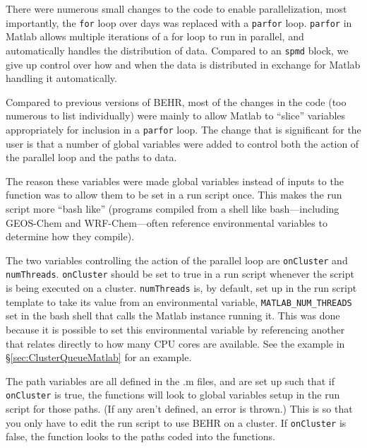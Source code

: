 \documentclass[12pt]{article}
\begin{document}
		There were numerous small changes to the code to enable parallelization, most importantly, the \texttt{for} loop over days was replaced with a \texttt{parfor} loop. \texttt{parfor} in Matlab allows multiple iterations of a for loop to run in parallel, and automatically handles the distribution of data.  Compared to an \texttt{spmd} block, we give up control over how and when the data is distributed in exchange for Matlab handling it automatically.
		
		Compared to previous versions of BEHR, most of the changes in the code (too numerous to list individually) were mainly to allow Matlab to ``slice'' variables appropriately for inclusion in a \texttt{parfor} loop.  The change that is significant for the user is that a number of global variables were added to control both the action of the parallel loop and the paths to data.  

		The reason these variables were made global variables instead of inputs to the function was to allow them to be set in a run script once. This makes the run script more ``bash like'' (programs compiled from a shell like bash---including GEOS-Chem and WRF-Chem---often reference environmental variables to determine how they compile).  
		
		The two variables controlling the action of the parallel loop are \texttt{onCluster} and \texttt{numThreads}. \texttt{onCluster} should be set to true in a run script whenever the script is being executed on a cluster.  \texttt{numThreads} is, by default, set up in the run script template to take its value from an environmental variable, \texttt{MATLAB\_NUM\_THREADS} set in the bash shell that calls the Matlab instance running it.  This was done because it is possible to set this environmental variable by referencing another that relates directly to how many CPU cores are available.  See the example in \S\ref{sec:ClusterQueueMatlab} for an example.
		
		The path variables are all defined in the .m files, and are set up such that if \texttt{onCluster} is true, the functions will look to global variables setup in the run script for those paths. (If any aren't defined, an error is thrown.)  This is so that you only have to edit the run script to use BEHR on a cluster.  If \texttt{onCluster} is false, the function looks to the paths coded into the functions.
\end{document}
